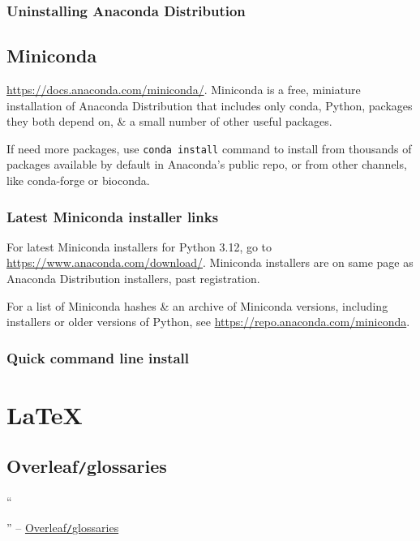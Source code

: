 \documentclass{article}
\begin{document}
\subsubsection{Uninstalling Anaconda Distribution}

\subsection{Miniconda}
\url{https://docs.anaconda.com/miniconda/}. Miniconda is a free, miniature installation of Anaconda Distribution that includes only conda, Python, packages they both depend on, \& a small number of other useful packages.

If need more packages, use {\tt conda install} command to install from thousands of packages available by default in Anaconda's public repo, or from other channels, like conda-forge or bioconda.

\subsubsection{Latest Miniconda installer links}
For latest Miniconda installers for Python 3.12, go to \url{https://www.anaconda.com/download/}. Miniconda installers are on same page as Anaconda Distribution installers, past registration.

For a list of Miniconda hashes \& an archive of Miniconda versions, including installers or older versions of Python, see \url{https://repo.anaconda.com/miniconda}.

\subsubsection{Quick command line install}


\section{\LaTeX}

\subsection{Overleaf{\tt/}glossaries}
``


'' -- \href{https://www.overleaf.com/learn/latex/Glossaries}{Overleaf{\tt/}glossaries}

\end{document}
